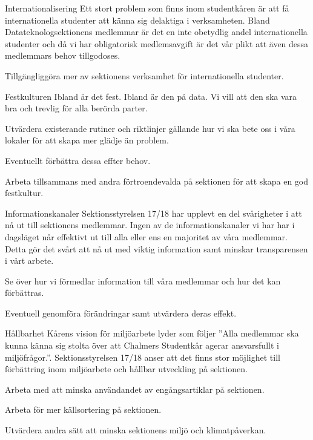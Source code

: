 \documentclass{dtek}
\begin{document}
  \begin{FokusPunkt}{Internationalisering}{
    Ett stort problem som finns inom studentkåren är att få internationella
    studenter att känna sig delaktiga i verksamheten.  Bland
    Datateknologsektionens medlemmar är det en inte obetydlig andel
    internationella studenter och då vi har obligatorisk medlemsavgift är det
    vår plikt att även dessa medlemmars behov tillgodoses.
  }
    \item Tillgängliggöra mer av sektionens verksamhet för internationella
      studenter.
  \end{FokusPunkt}

  \begin{FokusPunkt}{Festkulturen}{
    Ibland är det fest. Ibland är den på data. Vi vill att den ska vara bra och
    trevlig för alla berörda parter.
  }
    \item Utvärdera existerande rutiner och riktlinjer gällande hur vi ska bete
      oss i våra lokaler för att skapa mer glädje än problem.
    \item Eventuellt förbättra dessa effter behov.
    \item Arbeta tillsammans med andra förtroendevalda på sektionen för att
      skapa en god festkultur.
  \end{FokusPunkt}

  \begin{FokusPunkt}{Informationskanaler}{
    Sektionsstyrelsen 17/18 har upplevt en del svårigheter i att nå ut till
    sektionens medlemmar. Ingen av de  informationskanaler vi har har i
    dagsläget når effektivt ut till alla eller ens en majoritet av våra
    medlemmar. Detta gör det svårt att nå ut med viktig information samt
    minskar transparensen i vårt arbete.
  }
    \item Se över hur vi förmedlar information till våra medlemmar och hur det
      kan förbättras.
    \item Eventuell genomföra förändringar samt utvärdera deras effekt.
  \end{FokusPunkt}

  \begin{FokusPunkt}{Hållbarhet}{
    Kårens vision för miljöarbete lyder som följer \textnormal{''Alla medlemmar
    ska kunna känna sig stolta över att Chalmers Studentkår agerar ansvarsfullt
    i miljöfrågor.''}. Sektionsstyrelsen 17/18 anser att det finns stor
    möjlighet till förbättring inom miljöarbete och hållbar utveckling på
    sektionen.
  }
    \item Arbeta med att minska användandet av engångsartiklar på sektionen.
    \item Arbeta för mer källsortering på sektionen.
    \item Utvärdera andra sätt att minska sektionens miljö och klimatpåverkan.
  \end{FokusPunkt}
\end{document}
